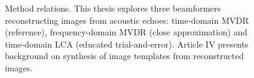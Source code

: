 {%
% 
% 
% 
% 

\begin{figure}[tp]
\caption{Method relations. This thesis explores three beamformers reconstructing images from acoustic echoes: time-domain MVDR (reference), frequency-domain MVDR (close approximation) and time-domain LCA (educated trial-and-error). Article IV presents background on synthesis of image templates from reconstructed images. }%
\label{2_fig_article_relation}
\end{figure}

}
